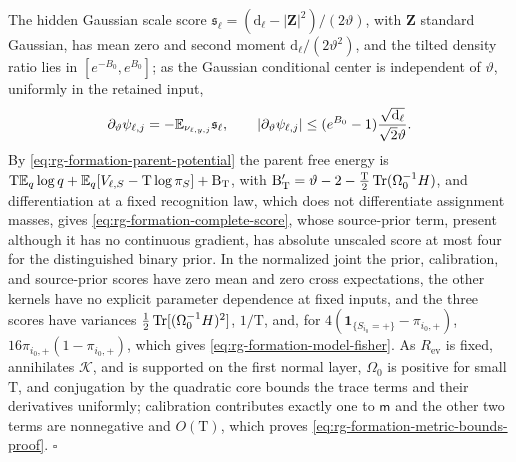 The hidden Gaussian scale score
\(\mathfrak s_\ell=(\mathrm d_\ell-|\mathbf Z|^2)/(2\vartheta)\), with
\(\mathbf Z\) standard Gaussian, has mean zero and second moment
\(\mathrm d_\ell/(2\vartheta^2)\), and the tilted density ratio lies in
\([e^{-B_0},e^{B_0}]\); as the Gaussian conditional center is independent of
\(\vartheta\), uniformly in the retained input,
\begin{equation}
 \partial_\vartheta\psi_{\ell,j}=-\mathbb E_{\nu_{\ell,y,j}}\mathfrak s_\ell,\qquad
 |\partial_\vartheta\psi_{\ell,j}|
 \le(e^{B_0}-1)\frac{\sqrt{\mathrm d_\ell}}{\sqrt2 \vartheta}.
 \label{eq:rg-formation-tilt-score-proof}
\end{equation}
By \cref{eq:rg-formation-parent-potential} the parent free energy is
\(\mathrm T\mathbb E_q\log q+\mathbb E_q[V_{\ell,S}-\mathrm T\log\pi_S]+\mathrm B_{\mathrm T}\),
with \(\mathrm B_{\mathrm T}'=\vartheta-2-\tfrac{\mathrm T}2\operatorname{Tr}(\Omega_0^{-1}H)\),
and differentiation at a fixed recognition law, which does not differentiate
assignment masses, gives \cref{eq:rg-formation-complete-score}, whose source-prior term, present
although it has no continuous gradient, has absolute unscaled score at most
four for the distinguished binary prior. In the normalized joint the prior, calibration, and source-prior
scores have zero mean and zero cross expectations, the other kernels have no
explicit parameter dependence at fixed inputs, and the three scores have
variances \(\tfrac12\operatorname{Tr}[(\Omega_0^{-1}H)^2]\), \(1/\mathrm T\), and, for
\(4(\mathbf 1_{\{S_{i_0}=+\}}-\pi_{i_0,+})\), \(16\pi_{i_0,+}(1-\pi_{i_0,+})\),
which gives \cref{eq:rg-formation-model-fisher}. As \(R_{\mathrm{ev}}\) is
fixed, annihilates \(\mathcal K\), and is supported on the first normal layer,
\(\Omega_0\) is positive for small \(\mathrm T\), and conjugation by the
quadratic core bounds the trace terms and their derivatives uniformly;
calibration contributes exactly one to \(\mathsf m\) and the other two terms
are nonnegative and \(O(\mathrm T)\), which proves
\cref{eq:rg-formation-metric-bounds-proof}. \hfill\(\square\)


